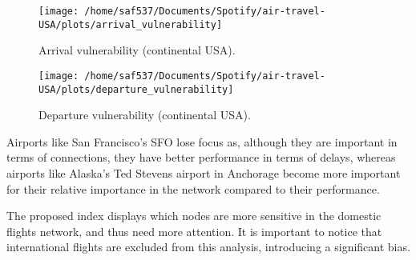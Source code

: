 \documentclass[a4paper, 11pt]{article}
\begin{document}
\begin{figure}[!ht]
  \caption{Arrival vulnerability (continental USA).}
  \label{arr_plot}
  \centering
    \texttt{[image: /home/saf537/Documents/Spotify/air-travel-USA/plots/arrival\_vulnerability]}
\end{figure}



\begin{center}
\end{center}


\begin{figure}[!ht]
  \caption{Departure vulnerability (continental USA).}
  \label{dep_plot}
  \centering
    \texttt{[image: /home/saf537/Documents/Spotify/air-travel-USA/plots/departure\_vulnerability]}
\end{figure}


Airports like San Francisco's SFO lose focus as, although they are important in terms of connections, they have better performance in terms of delays, whereas airports like Alaska's Ted Stevens airport in Anchorage become more important for their relative importance in the network compared to their performance. 

The proposed index displays which nodes are more sensitive in the domestic flights network, and thus need more attention. It is important to notice that international flights are excluded from this analysis, introducing a significant bias.


\end{document}
